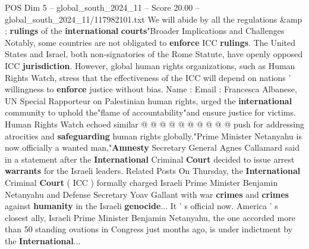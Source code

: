 \begin{textsample}{POS Dim 5 – global\_south\_2024\_11 – Score 20.00 – global\_south\_2024\_11/117982101.txt}
We will abide by all the regulations \&amp ; \textbf{rulings} of the \textbf{international} \textbf{courts}"Broader Implications and Challenges Notably, some countries are not obligated to \textbf{enforce} ICC \textbf{rulings}.
The United States and Israel, both non-signatories of the Rome Statute, have openly opposed ICC \textbf{jurisdiction}.
However, global human rights organizations, such as Human Rights Watch, stress that the effectiveness of the ICC will depend on nations ' willingness to \textbf{enforce} justice without bias.
Name : Email : Francesca Albanese, UN Special Rapporteur on Palestinian human rights, urged the \textbf{international} community to uphold the"flame of accountability"and ensure justice for victims.
Human Rights Watch echoed similar @ @ @ @ @ @ @ @ @ @ push for addressing atrocities and \textbf{safeguarding} human rights globally."Prime Minister Netanyahu is now officially a wanted man,"\textbf{Amnesty} Secretary General Agnes Callamard said in a statement after the \textbf{International} Criminal \textbf{Court} decided to issue arrest \textbf{warrants} for the Israeli leaders.
Related Posts On Thursday, the \textbf{International} Criminal \textbf{Court} ( ICC ) formally charged Israeli Prime Minister Benjamin Netanyahu and Defense Secretary Yoav Gallant with war \textbf{crimes} and \textbf{crimes} against \textbf{humanity} in the Israeli \textbf{genocide}...
It ' s official now.
America ' s closest ally, Israeli Prime Minister Benjamin Netanyahu, the one accorded more than 50 standing ovations in Congress just months ago, is under indictment by the \textbf{International}...

\end{textsample}
